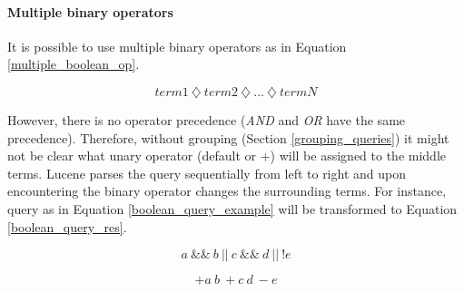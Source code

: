 \paragraph{Multiple binary operators}
It is possible to use multiple binary operators as in Equation \ref{multiple_boolean_op}.

\begin{equation}
\label{multiple_boolean_op}
term1\ \diamondsuit \ term2\ \diamondsuit \ … \ \diamondsuit \ termN
\end{equation}

However, there is no operator precedence (\textit{AND} and \textit{OR} have the same precedence). Therefore, without grouping
(Section \ref{grouping_queries}) it might
not be clear what unary operator (default or +) will be assigned to the middle terms.
Lucene parses the query sequentially from left to right and upon encountering the binary operator changes the surrounding terms. For instance,
query as in Equation \ref{boolean_query_example} will be transformed to Equation \ref{boolean_query_res}.

\begin{equation}
\label{boolean_query_example}
a\ \&\&\ b\ \vert\vert\ c\ \&\&\ d\ \vert\vert\ !e
\end{equation}

\begin{equation}
\label{boolean_query_res}
{+}a\ b\ {+}c\ d\ {-}e
\end{equation}

